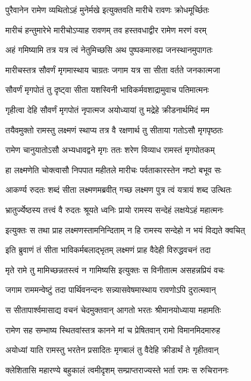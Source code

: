 \twolineshloka
{पुरैवानेन रामेण व्यथितोऽहं मुनेर्मखे}
{इत्युक्तवति मारीचे रावणः क्रोधमूर्च्छितः} %

\twolineshloka
{मारीचं हन्तुमारेभे मारीचोऽप्याह रावणम्}
{तव हस्तवधाद्वीर रामेण मरणं वरम्} %

\twolineshloka
{अहं गमिष्यामि तत्र यत्र त्वं नेतुमिच्छसि}
{अथ पुष्पकमारुह्य जनस्थानमुपागतः} %

\twolineshloka
{मारीचस्तत्र सौवर्णं मृगमास्थाय चाग्रतः}
{जगाम यत्र सा सीता वर्तते जनकात्मजा} %

\twolineshloka
{सौवर्णं मृगपोतं तु दृष्ट्वा सीता यशस्विनी}
{भाविकर्मवशाद्रामुवाच पतिमात्मनः} %

\twolineshloka
{गृहीत्वा देहि सौवर्णं मृगपोतं नृपात्मज}
{अयोध्यायां तु मद्रेहे क्रीडनार्थमिदं मम} %

\twolineshloka
{तयैवमुक्तो रामस्तु लक्ष्मणं स्थाप्य तत्र वै}
{रक्षणार्थ तु सीताया गतोऽसौ मृगपृष्ठतः} %

\twolineshloka
{रामेण चानुयातोऽसौ अभ्यधावद्वने मृगः}
{ततः शरेण विव्याध रामस्तं मृगपोतकम्} %

\twolineshloka
{हा लक्ष्मणेति चोक्त्वासौ निपपात महीतले}
{मारीचः पर्वताकारस्तेन नष्टो बभूव सः} %

\twolineshloka
{आकर्ण्य रुदतः शब्दं सीता लक्ष्मणमब्रवीत्}
{गच्छ लक्ष्मण पुत्र त्वं यत्रायं शब्द उत्थितः} %

\twolineshloka
{भ्रातुर्ज्येष्ठस्य तत्त्वं वै रुदतः श्रूयते ध्वनिः}
{प्रायो रामस्य सन्देहं लक्षयेऽहं महात्मनः} %

\twolineshloka
{इत्युक्तः स तथा प्राह लक्ष्मणस्तामनिन्दिताम्}
{न हि रामस्य सन्देहो न भयं विद्यते क्वचित्} %

\twolineshloka
{इति ब्रुवाणं तं सीता भाविकर्मबलाद्भृतम्}
{लक्ष्मणं प्राह वैदेही विरुद्धवचनं तदा} %

\twolineshloka
{मृते रामे तु मामिच्छन्नतस्त्वं न गामिष्यसि}
{इत्युक्तः स विनीतात्म असहन्नप्रियं वचः} %

\twolineshloka
{जगाम राममन्वेष्टुं तदा पार्थिवनन्दनः}
{सन्न्यासवेषमास्थाय रावणोऽपि दुरात्मवान्} %

\twolineshloka
{स सीतापार्श्वमासाद्य वचनं चेदमुक्तवान्}
{आगतो भरतः श्रीमानयोध्याया महामतिः} %

\twolineshloka
{रामेण सह सम्भाष्य स्थितवांस्तत्र कानने}
{मां च प्रेषितवान् रामो विमानमिदमारुह} %

\twolineshloka
{अयोध्यां याति रामस्तु भरतेन प्रसादितः}
{मृगबालं तु वैदेहि क्रीडार्थं ते गृहीतवान्} %

\twolineshloka
{क्लेशितासि महारण्ये बहुकालं त्वमीदृशम्}
{सम्प्राप्तराज्यस्ते भर्ता रामः स रुचिराननः} %


